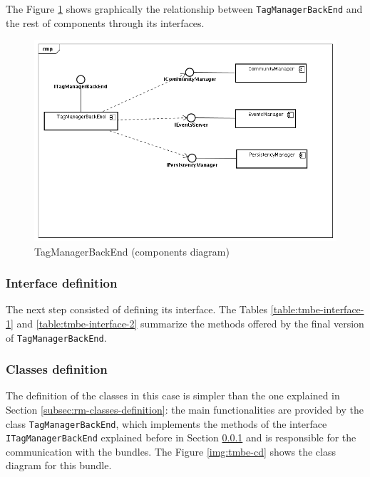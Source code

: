 The Figure \ref{img:tmbe-components} shows graphically the relationship between
\verb|TagManagerBackEnd| and the rest of components through its interfaces.

\begin{figure}[h!]
 \begin{center}
 \includegraphics[scale=0.4]{diagrams/TagManagerBackEndComponentsDiagram.png}
  \caption{\label{img:tmbe-components}TagManagerBackEnd (components diagram)}
 \end{center}
\end{figure}

\subsubsection{Interface definition}
\label{subsubsec:tmbe-interface-definition}

The next step consisted of defining its interface. The Tables
\ref{table:tmbe-interface-1} and \ref{table:tmbe-interface-2} summarize the
methods offered by the final version of \verb|TagManagerBackEnd|.



\clearpage

\subsubsection{Classes definition}
The definition of the classes in this case is simpler than the one explained in
Section \ref{subsec:rm-classes-definition}: the main functionalities are
provided by the class \verb|TagManagerBackEnd|, which implements the methods of
the interface \verb|ITagManagerBackEnd| explained before in
Section \ref{subsubsec:tmbe-interface-definition} and is responsible for the
communication with the bundles.
\newline
The Figure \ref{img:tmbe-cd} shows the class diagram for this bundle.

